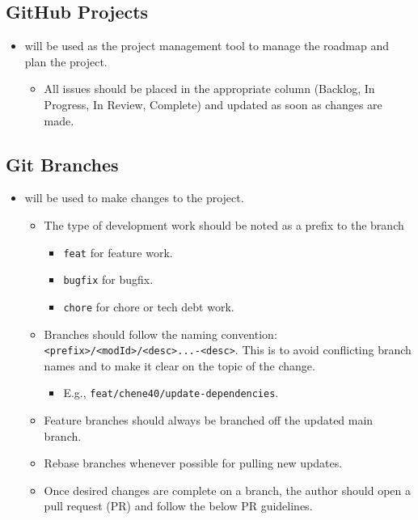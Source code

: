 \documentclass{article}
\begin{document}
\subsection{GitHub Projects}
\begin{itemize}
    \item will be used as the project management tool to manage the roadmap and plan the project.
    \begin{itemize}
        \item All issues should be placed in the appropriate column (Backlog, In Progress, In Review, Complete) and updated as soon as changes are made.
    \end{itemize}
\end{itemize}

\newpage

\subsection{Git Branches}
\begin{itemize}
    \item will be used to make changes to the project.
    \begin{itemize}
        \item The type of development work should be noted as a prefix to the branch
        \begin{itemize}
            \item \texttt{feat} for feature work.
            \item \texttt{bugfix} for bugfix.
            \item \texttt{chore} for chore or tech debt work.
        \end{itemize}
        \item Branches should follow the naming convention: \texttt{<prefix>/<modId>/<desc>...-<desc>}. This is to avoid conflicting branch names and to make it clear on the topic of the change.
        \begin{itemize}
            \item E.g., \texttt{feat/chene40/update-dependencies}.
        \end{itemize}
        \item Feature branches should always be branched off the updated main branch.
        \item Rebase branches whenever possible for pulling new updates.
        \item Once desired changes are complete on a branch, the author should open a pull request (PR) and follow the below PR guidelines.
    \end{itemize}
\end{itemize}
\end{document}
